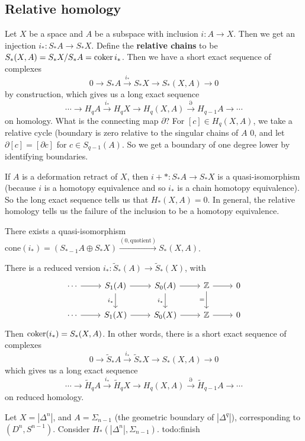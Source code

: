 \subsection{Relative homology}
Let $X$ be a space and $A$ be a subspace with inclusion $i \colon A \to X$. Then we get an injection $i_* \colon S_*A \to S_*X$. Define the \textbf{relative chains} to be $S_*(X,A)=S_*X/S_*A=\operatorname{coker} i_*$. Then we have a short exact sequence of complexes \[
    0 \to S_*A \xrightarrow{i_*} S_*X \to  S_*(X,A) \to 0
\] by construction, which gives us a long exact sequence \[
\cdots \to H_qA \xrightarrow{i_*} H_qX \to H_q(X,A) \xrightarrow{\partial }  H_{q-1}A \to \cdots 
\] on homology. What is the connecting map $\partial $? For $[c] \in H_q(X,A)$, we take a relative cycle (boundary is zero relative to the singular chains of $A$ 0, and let $\partial [c] =[\partial  c]$ for $c \in S_{q-1}(A)$. So we get a boundary of one degree lower by identifying boundaries. 
\begin{example}
    If $A$ is a deformation retract of $X$, then $i+* \colon S_*A \to S_*X$ is a quasi-isomorphism (because $i$ is a homotopy equivalence and so $i_*$ is a chain homotopy equivalence). So the long exact sequence tells us that $H_*(X,A)=0$. In general, the relative homology tells us the failure of the inclusion to be a homotopy equivalence.
\end{example}
\begin{remark}
    There exists a quasi-isomorphism $\mathrm{cone}(i_*)=(S_{*-1}A\oplus S_* X )\xrightarrow{(0, \text{quotient} )}   S_*(X,A)$.
\end{remark}
There is a reduced version $i_* \colon \widetilde S_*(A) \to \widetilde S_*(X)$, with  \[
\begin{tikzcd}
\cdots \arrow[r] & S_1(A) \arrow[d, "i_*"'] \arrow[r] & S_0(A) \arrow[d, "i_*"'] \arrow[r] & \Z \arrow[d, "="'] \arrow[r] & 0 \\
\cdots \arrow[r] & S_1(X) \arrow[r]                   & S_0(X) \arrow[r]                   & \Z \arrow[r]                 & 0
\end{tikzcd}
\] Then $\operatorname{coker} (i_*)=S_*(X,A)$. In other words, there is a short exact sequence of complexes \[
    0 \to \widetilde S_*A \xrightarrow{i_*} \widetilde S_*X \to  S_*(X,A) \to 0
\] which gives us a long exact sequence \[
\cdots \to \widetilde H_qA \xrightarrow{i_*} \widetilde H_qX \to H_q(X,A) \xrightarrow{\partial }  \widetilde H_{q-1}A \to \cdots 
\] on reduced homology.

\begin{example}
    Let $X=|\Delta ^n |$, and $A=\Sigma _{n-1}$ (the geometric boundary of $|\Delta ^q|$), corresponding to $(D^n ,S^{n-1})$. Consider $H_*(|\Delta ^n |,\Sigma _{n-1})$. {\color{red}todo:finish} 
\end{example}
